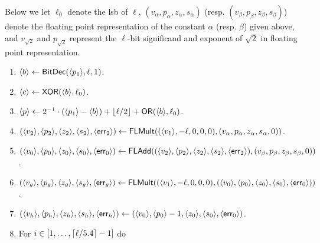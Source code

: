 Below we let $\ell_0$ denote the lsb of $\ell$,
$(v_\alpha,p_\alpha,z_\alpha,s_\alpha)$
(resp.  $(v_\beta,p_\beta,z_\beta,s_\beta)$)
denote the floating point representation of the constant $\alpha$ (resp. $\beta$)
given above,
and $v_{\sqrt{2}}$ and $p_{\sqrt{2}}$ represent the $\ell$-bit significand and exponent of
$\sqrt{2}$ in floating point representation.
\begin{enumerate}
\item $\langle b \rangle \leftarrow \mathsf{BitDec}(\langle p_1 \rangle,\ell,1)$.
\item $\langle c \rangle \leftarrow \mathsf{XOR}(\langle b \rangle,\ell_0)$. 
\item $\langle p \rangle \leftarrow 2^{-1} \cdot (\langle p_1 \rangle-\langle b \rangle)
		+{\lfloor \ell/2 \rfloor}+\mathsf{OR}(\langle b \rangle,\ell_0)$.
\item $(\langle v_2 \rangle,\langle p_2 \rangle,\langle z_2 \rangle,\langle s_2 \rangle,\langle \mathsf{err}_2 \rangle)
	\leftarrow \mathsf{FLMult}((\langle v_1 \rangle,-\ell,0,0,0),(v_\alpha,p_\alpha,z_\alpha,s_\alpha,0))$.
\item $(\langle v_0 \rangle,\langle p_0 \rangle,\langle z_0 \rangle,\langle s_0 \rangle,\langle \mathsf{err}_0 \rangle)
	\leftarrow \mathsf{FLAdd}((\langle v_2 \rangle,\langle p_2 \rangle,\langle z_2 \rangle,\langle s_2 \rangle,\langle \mathsf{err}_2 \rangle),(v_\beta,p_\beta,z_\beta,s_\beta,0))$.
\item $(\langle v_g \rangle,\langle p_g \rangle,\langle z_g \rangle,\langle s_g \rangle,\langle \mathsf{err}_g \rangle)
	\leftarrow \mathsf{FLMult}((\langle v_1 \rangle,-\ell,0,0,0),(\langle v_0 \rangle,\langle p_0 \rangle,\langle z_0 \rangle,\langle s_0 \rangle,\langle \mathsf{err}_0 \rangle))$.
\item  $(\langle v_h \rangle,\langle p_h \rangle,\langle z_h \rangle,\langle s_h \rangle,\langle \mathsf{err}_h \rangle)
	\leftarrow   (\langle v_0 \rangle,\langle p_0 \rangle-1,\langle z_0 \rangle,\langle s_0 \rangle,\langle \mathsf{err}_0 \rangle)$.
\item For $i \in [1,\ldots,{\lceil \ell/5.4 \rceil}-1]$ do
\end{enumerate}
